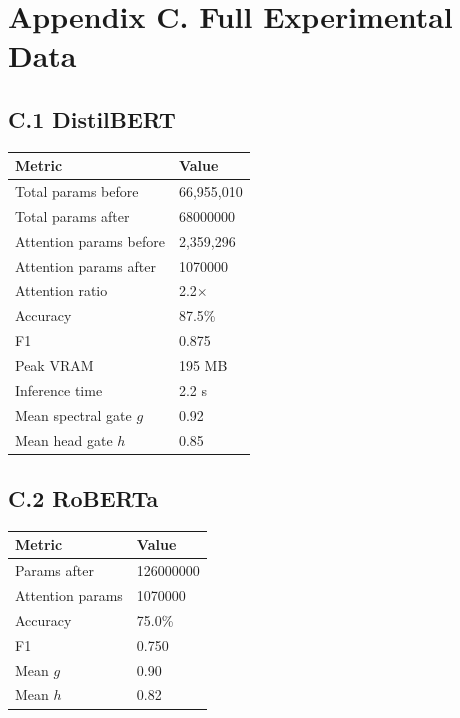 \section{Appendix C. Full Experimental Data}

\subsection{C.1 DistilBERT}

\begin{table}[H]
\centering
\small
\begin{tabular}{ll}
\toprule
\textbf{Metric} & \textbf{Value} \\
\midrule
Total params before & 66,955,010 \\
Total params after & 68000000 \\
Attention params before & 2,359,296 \\
Attention params after & 1070000 \\
Attention ratio & 2.2$\times$ \\
Accuracy & 87.5\% \\
F1 & 0.875 \\
Peak VRAM & 195 MB \\
Inference time & 2.2 s \\
Mean spectral gate $g$ & 0.92 \\
Mean head gate $h$ & 0.85 \\
\bottomrule
\end{tabular}
\end{table}

\subsection{C.2 RoBERTa}

\begin{table}[H]
\centering
\small
\begin{tabular}{ll}
\toprule
\textbf{Metric} & \textbf{Value} \\
\midrule
Params after & 126000000 \\
Attention params & 1070000 \\
Accuracy & 75.0\% \\
F1 & 0.750 \\
Mean $g$ & 0.90 \\
Mean $h$ & 0.82 \\
\bottomrule
\end{tabular}
\end{table}

